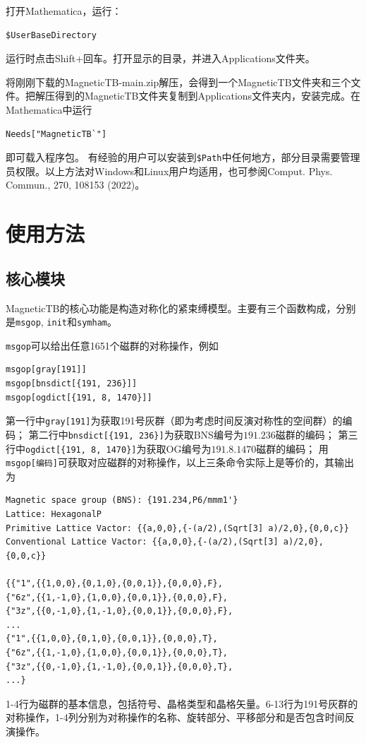 \documentclass[titlepage,a4paper,12pt,AutoFakeBold]{article}
\begin{document}
打开Mathematica，运行：
\begin{lstlisting}[numbers=none]
$UserBaseDirectory
\end{lstlisting}
运行时点击Shift+回车。打开显示的目录，并进入Applications文件夹。

将刚刚下载的MagneticTB-main.zip解压，会得到一个MagneticTB文件夹和三个文件。把解压得到的MagneticTB文件夹复制到Applications文件夹内，安装完成。在Mathematica中运行
\begin{lstlisting}[numbers=none]
Needs["MagneticTB`"]
\end{lstlisting}	
即可载入程序包。
有经验的用户可以安装到\lstinline|$Path|中任何地方，部分目录需要管理员权限。以上方法对Windows和Linux用户均适用，也可参阅Comput. Phys. Commun.,
270,
108153 (2022)。

\section{使用方法}
\subsection{核心模块}
\textsf{MagneticTB}的核心功能是构造对称化的紧束缚模型。主要有三个函数构成，分别是\lstinline|msgop|, \lstinline|init|和\lstinline|symham|。

\lstinline|msgop|可以给出任意1651个磁群的对称操作，例如
\begin{lstlisting}
msgop[gray[191]]
msgop[bnsdict[{191, 236}]]
msgop[ogdict[{191, 8, 1470}]]
\end{lstlisting}	
第一行中\lstinline|gray[191]|为获取191号灰群（即为考虑时间反演对称性的空间群）的编码；
第二行中\lstinline|bnsdict[{191, 236}]|为获取BNS编号为$191.236$磁群的编码；
第三行中\lstinline|ogdict[{191, 8, 1470}]|为获取OG编号为$191.8.1470$磁群的编码；
用\lstinline|msgop[编码]|可获取对应磁群的对称操作，以上三条命令实际上是等价的，其输出为

\begin{lstlisting}
Magnetic space group (BNS): {191.234,P6/mmm1'}
Lattice: HexagonalP
Primitive Lattice Vactor: {{a,0,0},{-(a/2),(Sqrt[3] a)/2,0},{0,0,c}}
Conventional Lattice Vactor: {{a,0,0},{-(a/2),(Sqrt[3] a)/2,0},{0,0,c}}

{{"1",{{1,0,0},{0,1,0},{0,0,1}},{0,0,0},F},
{"6z",{{1,-1,0},{1,0,0},{0,0,1}},{0,0,0},F},
{"3z",{{0,-1,0},{1,-1,0},{0,0,1}},{0,0,0},F},
...
{"1",{{1,0,0},{0,1,0},{0,0,1}},{0,0,0},T},
{"6z",{{1,-1,0},{1,0,0},{0,0,1}},{0,0,0},T},
{"3z",{{0,-1,0},{1,-1,0},{0,0,1}},{0,0,0},T},
...}
\end{lstlisting}
1-4行为磁群的基本信息，包括符号、晶格类型和晶格矢量。6-13行为191号灰群的对称操作，1-4列分别为对称操作的名称、旋转部分、平移部分和是否包含时间反演操作。
\end{document}
